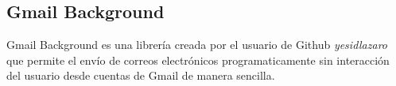  
 \subsection{Gmail Background}
  \label{subsec:gmail-background}
 
 Gmail Background es una librería creada por el usuario de Github \textit{yesidlazaro} que permite el envío de correos electrónicos programaticamente sin interacción del usuario desde cuentas de Gmail de manera sencilla.
 